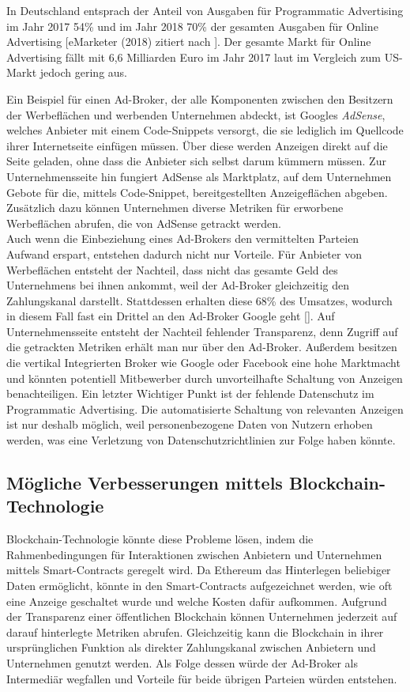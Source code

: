 In Deutschland entsprach der Anteil von Ausgaben für Programmatic Advertising im Jahr 2017 54\% und im Jahr 2018 70\% der gesamten Ausgaben für Online Advertising [eMarketer (2018) zitiert nach \cite[21]{optimity_advisors_2019}]. Der gesamte Markt für Online Advertising fällt mit 6,6 Milliarden Euro im Jahr 2017 laut \cite{optimity_advisors_2019} im Vergleich zum US-Markt jedoch gering aus.

Ein Beispiel für einen Ad-Broker, der alle Komponenten zwischen den Besitzern der Werbeflächen und werbenden Unternehmen abdeckt, ist Googles \emph{AdSense}, welches Anbieter mit einem Code-Snippets versorgt, die sie lediglich im Quellcode ihrer Internetseite einfügen müssen. Über diese werden Anzeigen direkt auf die Seite geladen, ohne dass die Anbieter sich selbst darum kümmern müssen. Zur Unternehmensseite hin fungiert AdSense als Marktplatz, auf dem Unternehmen Gebote für die, mittels Code-Snippet, bereitgestellten Anzeigeflächen abgeben. 
Zusätzlich dazu können Unternehmen diverse Metriken für erworbene Werbeflächen abrufen, die von AdSense getrackt werden. \\

Auch wenn die Einbeziehung eines Ad-Brokers den vermittelten Parteien Aufwand erspart, entstehen dadurch nicht nur Vorteile. 
Für Anbieter von Werbeflächen entsteht der Nachteil, dass nicht das gesamte Geld des Unternehmens bei ihnen ankommt, weil der Ad-Broker gleichzeitig den Zahlungskanal darstellt. 
Stattdessen erhalten diese 68\% des Umsatzes, wodurch in diesem Fall fast ein Drittel an den Ad-Broker Google geht [\cite{google_adsense_2021}]. Auf Unternehmensseite entsteht der Nachteil fehlender Transparenz, denn Zugriff auf die getrackten Metriken erhält man nur über den Ad-Broker. Außerdem besitzen die vertikal Integrierten Broker wie Google oder Facebook eine hohe Marktmacht und könnten potentiell Mitbewerber durch unvorteilhafte Schaltung von Anzeigen benachteiligen. Ein letzter Wichtiger Punkt ist der fehlende Datenschutz im Programmatic Advertising. Die automatisierte Schaltung von relevanten Anzeigen ist nur deshalb möglich, weil personenbezogene Daten von Nutzern erhoben werden, was eine Verletzung von Datenschutzrichtlinien zur Folge haben könnte.

\subsection{Mögliche Verbesserungen mittels Blockchain-Technologie}
Blockchain-Technologie könnte diese Probleme lösen, indem die Rahmenbedingungen für Interaktionen zwischen Anbietern und Unternehmen mittels Smart-Contracts geregelt wird. 
Da Ethereum das Hinterlegen beliebiger Daten ermöglicht, könnte in den Smart-Contracts aufgezeichnet werden, wie oft eine Anzeige geschaltet wurde und welche Kosten dafür aufkommen. 
Aufgrund der Transparenz einer öffentlichen Blockchain können Unternehmen jederzeit auf darauf hinterlegte Metriken abrufen. Gleichzeitig kann die Blockchain in ihrer ursprünglichen Funktion als direkter Zahlungskanal zwischen Anbietern und Unternehmen genutzt werden. Als Folge dessen würde der Ad-Broker als Intermediär wegfallen und Vorteile für beide übrigen Parteien würden entstehen.
